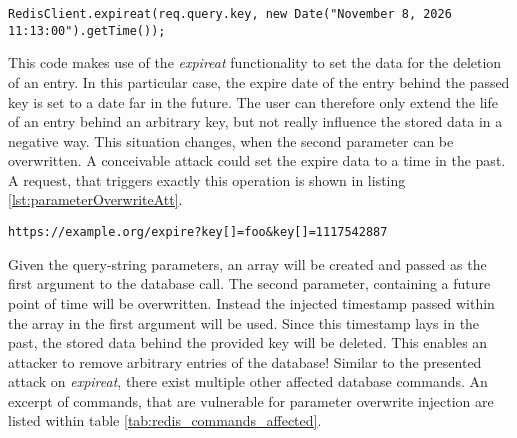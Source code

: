 \begin{lstlisting}[caption={Vulnerable NodeJS example for parameter overwrite injection on Redis}, label={lst:parameterOverwriteApp}]
RedisClient.expireat(req.query.key, new Date("November 8, 2026 11:13:00").getTime());
\end{lstlisting}

This code makes use of the \emph{expireat} functionality to set the data for the deletion of an entry. In this particular case, the expire date of the entry behind the passed key is set to a date far in the future. The user can therefore only extend the life of an entry behind an arbitrary key, but not really influence the stored data in a negative way. This situation changes, when the second parameter can be overwritten. A conceivable attack could set the expire data to a time in the past. A request, that triggers exactly this operation is shown in listing \ref{lst:parameterOverwriteAtt}. \\

\begin{lstlisting}[caption={Attack vector on Redis for query selector injection via the query-string parameter}, label={lst:parameterOverwriteAtt}]
https://example.org/expire?key[]=foo&key[]=1117542887
\end{lstlisting}

Given the query-string parameters, an array will be created and passed as the first argument to the database call. The second parameter, containing a future point of time will be overwritten. Instead the injected timestamp passed within the array in the first argument will be used. Since this timestamp lays in the past, the stored data behind the provided key will be deleted. This enables an attacker to remove arbitrary entries of the database! Similar to the presented attack on \emph{expireat}, there exist multiple other affected database commands. An excerpt of commands, that are vulnerable for parameter overwrite injection are listed within table \ref{tab:redis_commands_affected}. \\

